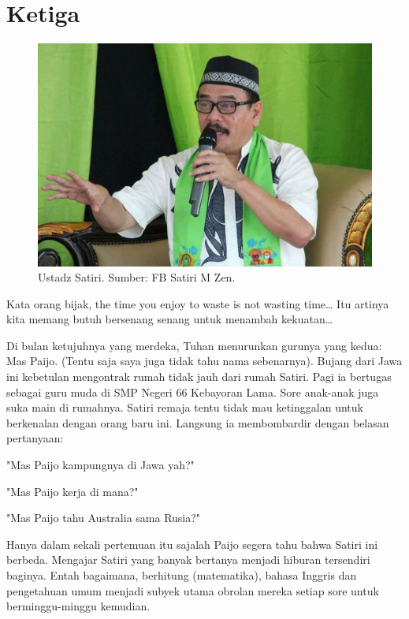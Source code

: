 
\chapter{Ketiga}

\begin{figure}[htbp]
\centerline{\includegraphics[scale=0.9]{01-03-01}}
\caption{Ustadz Satiri. Sumber: FB Satiri M Zen.}
\label{01-03-01}
\end{figure}
%

Kata orang bijak, the time you enjoy to waste is not wasting time… Itu artinya kita memang butuh bersenang senang untuk menambah kekuatan…

Di bulan ketujuhnya yang merdeka, Tuhan menurunkan gurunya yang kedua: Mas Paijo. (Tentu saja saya juga tidak tahu nama sebenarnya). Bujang dari Jawa ini kebetulan mengontrak rumah tidak jauh dari rumah Satiri. Pagi ia bertugas sebagai guru muda di SMP Negeri 66 Kebayoran Lama. Sore anak-anak juga suka main di rumahnya. Satiri remaja tentu tidak mau ketinggalan untuk berkenalan dengan orang baru ini. Langsung ia membombardir dengan belasan pertanyaan:

"Mas Paijo kampungnya di Jawa yah?"

"Mas Paijo kerja di mana?"

"Mas Paijo tahu Australia sama Rusia?"

Hanya dalam sekali pertemuan itu sajalah Paijo segera tahu bahwa Satiri ini berbeda. Mengajar Satiri yang banyak bertanya menjadi hiburan tersendiri baginya. Entah bagaimana, berhitung (matematika), bahasa Inggris dan pengetahuan umum menjadi subyek utama obrolan mereka setiap sore untuk berminggu-minggu kemudian.


